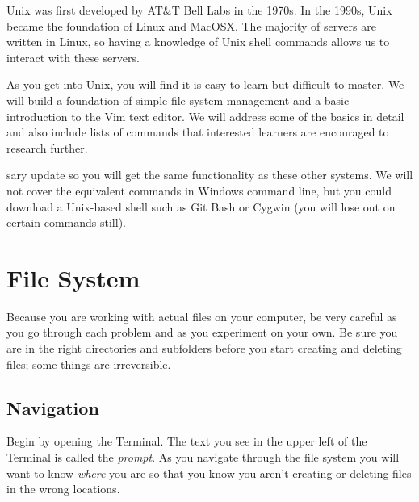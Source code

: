 \label{lab:Shell}


Unix was first developed by AT\&T Bell Labs in the 1970s. In the 1990s, Unix became the foundation of Linux and MacOSX. The majority of servers are written in Linux, so having a knowledge of Unix shell commands allows us to interact with these servers. 

As you get into Unix, you will find it is easy to learn but difficult to master.
We will build a foundation of simple file system management and a basic introduction to the Vim text editor.  
We will address some of the basics in detail and also include lists of commands that interested learners are encouraged to research further.

\begin{info} sary update so you will get the same functionality as these other systems.
We will not cover the equivalent commands in Windows command line, but you could download a Unix-based shell such as Git Bash or Cygwin (you will lose out on certain commands still).
\end{info}

\section*{File System}

\begin{warn}
Because you are working with actual files on your computer, be very careful as you go through each problem and as you experiment on your own.
Be sure you are in the right directories and subfolders before you start creating and deleting files; some things are irreversible.
\end{warn}

\subsection*{Navigation}
Begin by opening the Terminal. The text you see in the upper left of the Terminal is called the \emph{prompt}.
As you navigate through the file system you will want to know \emph{where} you are so that you know you aren't creating or deleting files in the wrong locations.


